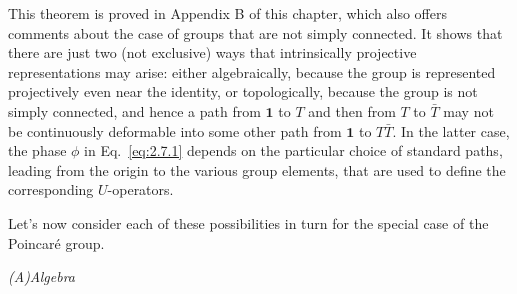 This theorem is proved in Appendix B of this chapter, which also offers comments
about the case of groups that are not simply connected. It shows that there are
just two (not exclusive) ways that intrinsically projective representations may
arise: either algebraically, because the group is represented projectively even
near the identity, or topologically, because the group is not simply connected,
and hence a path from $\mathbf{1}$ to $T$ and then from $T$ to $\bar T$ may not
be continuously deformable into some other path from $\mathbf{1}$ to
$T\bar T$. In the latter case, the phase $\phi$ in Eq.~\eqref{eq:2.7.1} depends on the
particular choice of standard paths, leading from the origin to the various
group elements, that are used to define the corresponding $U$-operators.

Let's now consider each of these possibilities in turn for the special case of
the Poincar\'e group.

\begin{center}
\emph{(A)\quad Algebra}
\end{center}

